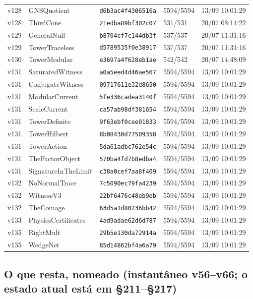 \documentclass[11pt]{article}
\theoremstyle{definition}\newtheorem{deriv}{Derivação}
\begin{document}
{\begin{longtable}{@{}lllll@{}}
v128 & GNSQuotient & \texttt{d6b3ac4f4306516a} & 5594/5594 & 13/09 10:01:29 \\
v128 & ThirdCone & \texttt{21edba89bf302c07} & 531/531 & 20/07 08:14:22 \\
v129 & GeneralNull & \texttt{b8704cf7c144db3f} & 537/537 & 20/07 11:31:16 \\
v129 & TowerTraceless & \texttt{d5789535f0e38917} & 537/537 & 20/07 11:31:16 \\
v130 & TowerModular & \texttt{e3697a4f628eb1ae} & 542/542 & 20/07 14:48:09 \\
v131 & SaturatedWitness & \texttt{a0a5eed4d46ae567} & 5594/5594 & 13/09 10:01:29 \\
v131 & ConjugateWitness & \texttt{09717611e32d8650} & 5594/5594 & 13/09 10:01:29 \\
v131 & ModularCurrent & \texttt{5fe336cadea3140f} & 5594/5594 & 13/09 10:01:29 \\
v131 & ScaleCurrent & \texttt{ca57ab98df381654} & 5594/5594 & 13/09 10:01:29 \\
v131 & TowerDefinite & \texttt{9f63ebf0cee01833} & 5594/5594 & 13/09 10:01:29 \\
v131 & TowerHilbert & \texttt{8b08430d77509358} & 5594/5594 & 13/09 10:01:29 \\
v131 & TowerAction & \texttt{5da61adbc762e54c} & 5594/5594 & 13/09 10:01:29 \\
v131 & TheFactorObject & \texttt{570ba4fd7b8edba4} & 5594/5594 & 13/09 10:01:29 \\
v131 & SignatureInTheLimit & \texttt{c38a0cef7aa8f409} & 5594/5594 & 13/09 10:01:29 \\
v132 & NoNormalTrace & \texttt{7c5090ec79fa4239} & 5594/5594 & 13/09 10:01:29 \\
v132 & WitnessV3 & \texttt{22bf6476c48eb9eb} & 5594/5594 & 13/09 10:01:29 \\
v132 & TheCoinage & \texttt{63d5a1d80236bb42} & 5594/5594 & 13/09 10:01:29 \\
v133 & PhysicsCertificates & \texttt{4ad9adae62d6d787} & 5594/5594 & 13/09 10:01:29 \\
v135 & RightMult & \texttt{29b5e130da72914a} & 5594/5594 & 13/09 10:01:29 \\
v135 & WedgeNet & \texttt{85d14862bf4a6a79} & 5594/5594 & 13/09 10:01:29 \\
\bottomrule\end{longtable}}

\subsection*{O que resta, nomeado (instantâneo v56--v66; o estado atual está em \S211--\S217)}
\end{document}
